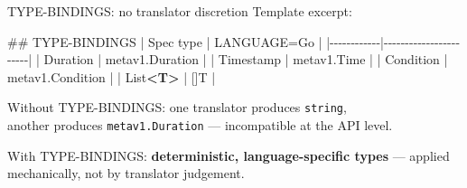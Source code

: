 \documentclass[
  10pt,
  ignorenonframetext,
  aspectratio=169,
  10pt]{beamer}
\newenvironment{Shaded}{}{}
\newcommand{\FunctionTok}[1]{\textcolor[rgb]{0.02,0.16,0.49}{#1}}
\newcommand{\KeywordTok}[1]{\textcolor[rgb]{0.00,0.44,0.13}{\textbf{#1}}}
\newcommand{\NormalTok}[1]{#1}
\begin{document}
\begin{frame}[fragile]{TYPE-BINDINGS: no translator discretion}
\protect\hypertarget{type-bindings-no-translator-discretion}{}
Template excerpt:

\begin{Shaded}
\begin{Highlighting}[]
\FunctionTok{\#\# TYPE{-}BINDINGS}
\NormalTok{| Spec type  | LANGUAGE=Go           |}
\NormalTok{|{-}{-}{-}{-}{-}{-}{-}{-}{-}{-}{-}{-}|{-}{-}{-}{-}{-}{-}{-}{-}{-}{-}{-}{-}{-}{-}{-}{-}{-}{-}{-}{-}{-}{-}{-}|}
\NormalTok{| Duration   | metav1.Duration       |}
\NormalTok{| Timestamp  | metav1.Time           |}
\NormalTok{| Condition  | metav1.Condition      |}
\NormalTok{| List}\KeywordTok{\textless{}T\textgreater{}}\NormalTok{    | []T                   |}
\end{Highlighting}
\end{Shaded}

\bigskip

Without TYPE-BINDINGS: one translator produces \texttt{string},\\
another produces \texttt{metav1.Duration} --- incompatible at the API
level.

\bigskip

With TYPE-BINDINGS: \textbf{deterministic, language-specific types} ---
applied\\
mechanically, not by translator judgement.
\end{frame}
\end{document}
